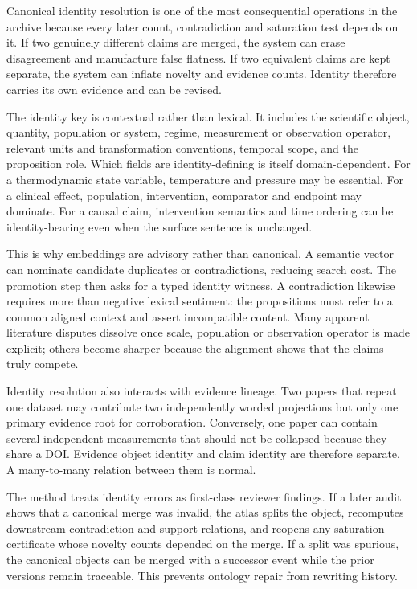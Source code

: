 Canonical identity resolution is one of the most consequential operations in the archive because every later count, contradiction and saturation test depends on it. If two genuinely different claims are merged, the system can erase disagreement and manufacture false flatness. If two equivalent claims are kept separate, the system can inflate novelty and evidence counts. Identity therefore carries its own evidence and can be revised.

The identity key is contextual rather than lexical. It includes the scientific object, quantity, population or system, regime, measurement or observation operator, relevant units and transformation conventions, temporal scope, and the proposition role. Which fields are identity-defining is itself domain-dependent. For a thermodynamic state variable, temperature and pressure may be essential. For a clinical effect, population, intervention, comparator and endpoint may dominate. For a causal claim, intervention semantics and time ordering can be identity-bearing even when the surface sentence is unchanged.

This is why embeddings are advisory rather than canonical. A semantic vector can nominate candidate duplicates or contradictions, reducing search cost. The promotion step then asks for a typed identity witness. A contradiction likewise requires more than negative lexical sentiment: the propositions must refer to a common aligned context and assert incompatible content. Many apparent literature disputes dissolve once scale, population or observation operator is made explicit; others become sharper because the alignment shows that the claims truly compete.

Identity resolution also interacts with evidence lineage. Two papers that repeat one dataset may contribute two independently worded projections but only one primary evidence root for corroboration. Conversely, one paper can contain several independent measurements that should not be collapsed because they share a DOI. Evidence object identity and claim identity are therefore separate. A many-to-many relation between them is normal.

The method treats identity errors as first-class reviewer findings. If a later audit shows that a canonical merge was invalid, the atlas splits the object, recomputes downstream contradiction and support relations, and reopens any saturation certificate whose novelty counts depended on the merge. If a split was spurious, the canonical objects can be merged with a successor event while the prior versions remain traceable. This prevents ontology repair from rewriting history.

